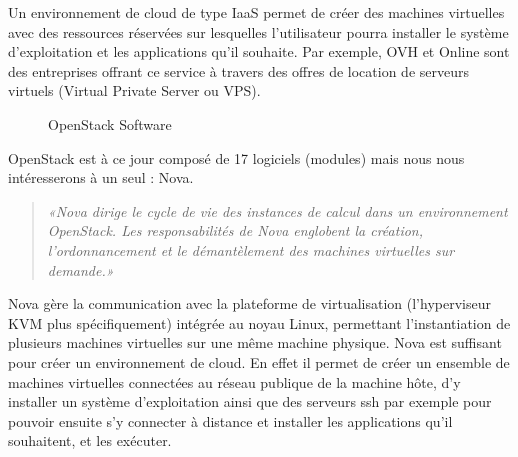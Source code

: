 \documentclass{report}
\begin{document}
        \bigbreak
    
        Un environnement de cloud de type IaaS permet de créer des machines virtuelles avec des ressources réservées sur lesquelles l'utilisateur pourra installer le système d'exploitation et les applications qu'il souhaite. Par exemple, OVH et Online sont des entreprises offrant ce service à travers des offres de location de serveurs virtuels (Virtual Private Server ou VPS).
        
        \begin{figure}[H]
            \caption{OpenStack Software \cite{openstack_software}}
        \end{figure}
        
        
        OpenStack est à ce jour composé de 17 logiciels (modules) mais nous nous intéresserons à un seul : Nova.
        \begin{quote}
            \textit{«Nova dirige le cycle de vie des instances de calcul dans un environnement OpenStack. Les responsabilités de Nova englobent la création, l'ordonnancement et le démantèlement des machines virtuelles sur demande.» \cite{openstack_nova}}
        \end{quote}
        
        \bigbreak
        
        Nova gère la communication avec la plateforme de virtualisation (l'hyperviseur KVM plus spécifiquement) intégrée au noyau Linux, permettant l'instantiation de plusieurs machines virtuelles sur une même machine physique.
        Nova est suffisant pour créer un environnement de cloud. En effet il permet de créer un ensemble de machines virtuelles connectées au réseau publique de la machine hôte, d'y installer un système d'exploitation ainsi que des serveurs ssh par exemple pour pouvoir ensuite s'y connecter à distance et installer les applications qu'il souhaitent, et les exécuter.
\end{document}
